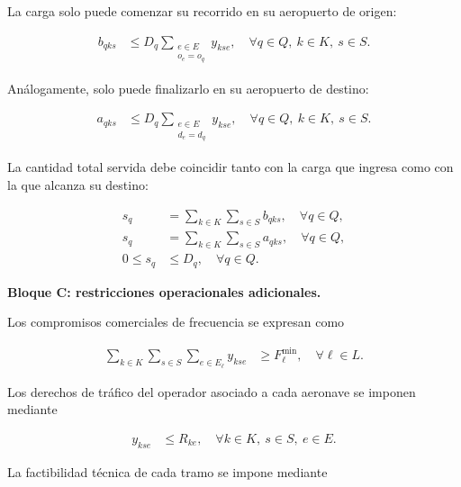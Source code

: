 La carga solo puede comenzar su recorrido en su aeropuerto de origen:

\begin{align}
b_{qks}
&\leq
D_q
\sum_{\substack{e\in E\\o_e=o_q}}
y_{kse},
\quad
\forall q\in Q,\ k\in K,\ s\in S.
\tag{R9a}
\label{eq:r9a}
\end{align}

Análogamente, solo puede finalizarlo en su aeropuerto de destino:

\begin{align}
a_{qks}
&\leq
D_q
\sum_{\substack{e\in E\\d_e=d_q}}
y_{kse},
\quad
\forall q\in Q,\ k\in K,\ s\in S.
\tag{R9b}
\label{eq:r9b}
\end{align}

La cantidad total servida debe coincidir tanto con la carga que ingresa como con la que
alcanza su destino:

\begin{align}
s_q
&=
\sum_{k\in K}\sum_{s\in S}b_{qks},
\quad
\forall q\in Q,
\tag{R9c}
\label{eq:r9c}
\\
s_q
&=
\sum_{k\in K}\sum_{s\in S}a_{qks},
\quad
\forall q\in Q,
\tag{R9d}
\label{eq:r9d}
\\
0\leq s_q
&\leq
D_q,
\quad
\forall q\in Q.
\tag{R9e}
\label{eq:r9e}
\end{align}



\vspace{0.5em}
\noindent\textbf{Bloque C: restricciones operacionales adicionales.}

Los compromisos comerciales de frecuencia se expresan como

\begin{align}
\sum_{k\in K}\sum_{s\in S}
\sum_{e\in E_\ell}
y_{kse}
&\geq
F_\ell^{\min},
\quad
\forall \ell\in L.
\tag{R10}
\label{eq:r10}
\end{align}

Los derechos de tráfico del operador asociado a cada aeronave se imponen mediante

\begin{align}
y_{kse}
&\leq
R_{ke},
\quad
\forall k\in K,\ s\in S,\ e\in E.
\tag{R11}
\label{eq:r11}
\end{align}

La factibilidad técnica de cada tramo se impone mediante

